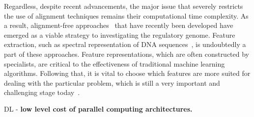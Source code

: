 Regardless, despite recent advancements, the major issue that severely restricts the use of alignment techniques remains their computational time complexity. As a result, alignment-free approaches~\cite{Vinga2003Alignment-freeReview,Pinello2014ApplicationsEpigenomics} that have recently been developed have emerged as a viable strategy to investigating the regulatory genome. Feature extraction, such as spectral representation of DNA sequences~\cite{LoBosco2014ASequences,LoBosco2015AlignmentClassification}, is undoubtedly a part of these approaches. Feature representations, which are often constructed by specialists, are critical to the effectiveness of traditional machine learning algorithms. Following that, it is vital to choose which features are more suited for dealing with the particular problem, which is still a very important and challenging stage today~\cite{LoBosco2017DeepClassification}.

DL - \textbf{low level cost of parallel computing architectures.}